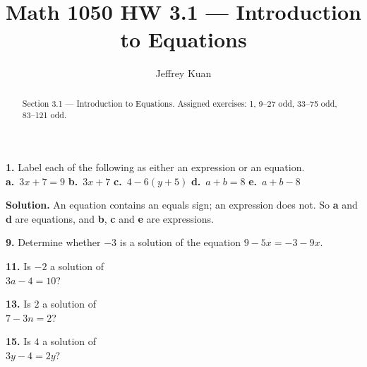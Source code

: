 \documentclass{ximera}
\author{Jeffrey Kuan}
\title{Math 1050 HW 3.1 --- Introduction to Equations}
\begin{document}
\begin{abstract}
    Section 3.1 --- Introduction to Equations.
    Assigned exercises: 1, 9–27 odd, 33–75 odd, 83–121 odd.
\end{abstract}

\maketitle

\begin{problem}
\textbf{1.} Label each of the following as either an expression or an equation.
  \\[2pt]
  \textbf{a.}~$3x + 7 = 9$ \qquad \textbf{b.}~$3x + 7$ \qquad
  \textbf{c.}~$4 - 6(y + 5)$ \qquad \textbf{d.}~$a + b = 8$ \qquad
  \textbf{e.}~$a + b - 8$

\begin{hint}
\textbf{Solution.} An equation contains an equals sign; an expression does not. So \textbf{a} and \textbf{d} are equations, and \textbf{b}, \textbf{c} and \textbf{e} are expressions.
\end{hint}
\end{problem}

\begin{problem}
\textbf{9.} Determine whether $-3$ is a solution of the equation $9 - 5x = -3 - 9x$.

\begin{multipleChoice}
\end{multipleChoice}
\end{problem}

\begin{problem}
\textbf{11.} Is $-2$ a solution of \\ $3a - 4 = 10$?

\begin{multipleChoice}
\end{multipleChoice}
\end{problem}

\begin{problem}
\textbf{13.} Is $2$ a solution of \\ $7 - 3n = 2$?

\begin{multipleChoice}
\end{multipleChoice}
\end{problem}

\begin{problem}
\textbf{15.} Is $4$ a solution of \\ $3y - 4 = 2y$?

\begin{multipleChoice}
\end{multipleChoice}
\end{problem}
\end{document}
